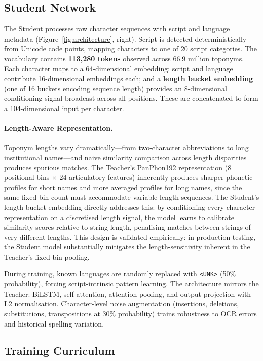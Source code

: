 \documentclass[11pt,a4paper]{article}
\begin{document}
\subsection{Student Network}
\label{subsec:student}

The Student processes raw character sequences with script and language metadata (Figure~\ref{fig:architecture}, right). Script is detected deterministically from Unicode code points, mapping characters to one of 20 script categories. The vocabulary contains \textbf{113,280 tokens} observed across 66.9 million toponyms. Each character maps to a 64-dimensional embedding; script and language contribute 16-dimensional embeddings each; and a \textbf{length bucket embedding} (one of 16 buckets encoding sequence length) provides an 8-dimensional conditioning signal broadcast across all positions. These are concatenated to form a 104-dimensional input per character.

\paragraph{Length-Aware Representation.} Toponym lengths vary dramatically---from two-character abbreviations to long institutional names---and naive similarity comparison across length disparities produces spurious matches. The Teacher's PanPhon192 representation (8 positional bins $\times$ 24 articulatory features) inherently produces sharper phonetic profiles for short names and more averaged profiles for long names, since the same fixed bin count must accommodate variable-length sequences. The Student's length bucket embedding directly addresses this: by conditioning every character representation on a discretised length signal, the model learns to calibrate similarity scores relative to string length, penalising matches between strings of very different lengths. This design is validated empirically: in production testing, the Student model substantially mitigates the length-sensitivity inherent in the Teacher's fixed-bin pooling.

During training, known languages are randomly replaced with \texttt{<UNK>} (50\% probability), forcing script-intrinsic pattern learning. The architecture mirrors the Teacher: BiLSTM, self-attention, attention pooling, and output projection with L2 normalisation. Character-level noise augmentation (insertions, deletions, substitutions, transpositions at 30\% probability) trains robustness to OCR errors and historical spelling variation.

\subsection{Training Curriculum}
\label{subsec:training}
\end{document}

